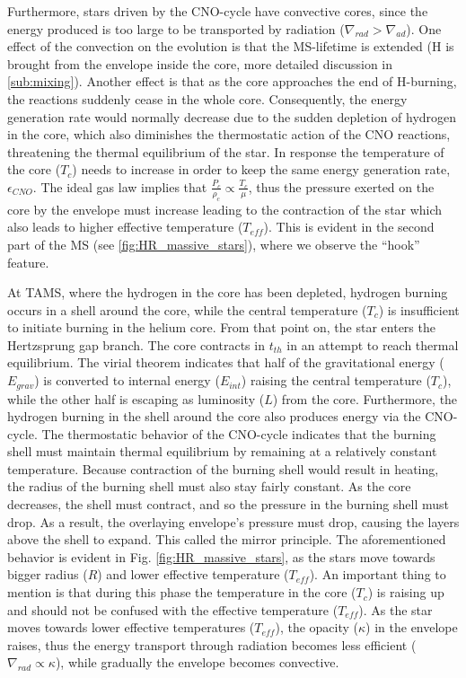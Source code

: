 Furthermore, stars driven by the CNO-cycle have convective cores, since the energy produced is too large to be transported by radiation ($\nabla_{rad} > \nabla_{ad}$). One effect of the convection on the evolution is that the MS-lifetime is extended (H is brought from the envelope inside the core, more detailed discussion in \cref{sub:mixing}). Another effect is that as the core approaches the end of H-burning, the reactions suddenly cease in the whole core. Consequently, the energy generation rate would normally decrease due to the sudden depletion of hydrogen in the core, which also diminishes the thermostatic action of the CNO reactions, threatening the thermal equilibrium of the star. In response the temperature of the core ($T_c$) needs to increase in order to keep the same energy generation rate, $\epsilon_{CNO}$. The ideal gas law implies that $\frac{P_c}{\rho_c} \propto \frac{T_c}{\mu}$, thus the pressure exerted on the core by the envelope must increase leading to the contraction of the star which also leads to higher effective temperature ($T_{eff}$). This is evident in the second part of the MS (see \cref{fig:HR_massive_stars}), where we observe the ``hook'' feature. 

At TAMS, where the hydrogen in the core has been depleted, hydrogen burning occurs in a shell around the core, while the central temperature ($T_c$) is insufficient to initiate burning in the helium core. From that point on, the star enters the Hertzsprung gap branch. The core contracts in $t_{th}$ in an attempt to reach thermal equilibrium. The virial theorem indicates that half of the gravitational energy ($E_{grav}$) is converted to internal energy ($E_{int}$) raising the central temperature ($T_c$), while the other half is escaping as luminosity ($L$) from the core. Furthermore, the hydrogen burning in the shell around the core also produces energy via the CNO-cycle. The thermostatic behavior of the CNO-cycle indicates that the burning shell must maintain thermal equilibrium by remaining at a relatively constant temperature. Because contraction of the burning shell would result in heating, the radius of the burning shell must also stay fairly constant. As the core decreases, the shell must contract, and so the pressure in the burning shell must drop. As a result, the overlaying envelope's pressure must drop, causing the layers above the shell to expand. This called the mirror principle. The aforementioned behavior is evident in Fig. \ref{fig:HR_massive_stars}, as the stars move towards bigger radius ($R$) and lower effective temperature ($T_{eff}$). An important thing to mention is that during this phase the temperature in the core ($T_c$) is raising up and should not be confused with the effective temperature ($T_{eff}$). As the star moves towards lower effective temperatures ($T_{eff}$), the opacity ($\kappa$) in the envelope raises, thus the energy transport through radiation becomes less efficient ($\nabla_{rad} \propto \kappa$), while gradually the envelope becomes convective.

